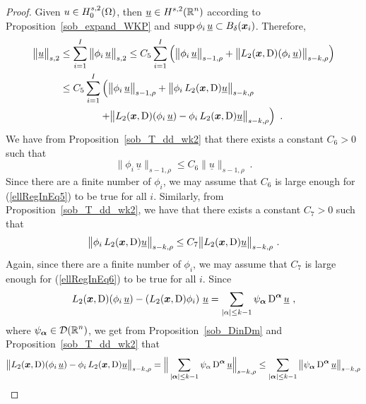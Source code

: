 \begin{proof}
Given $\displaystyle u \in H^{s,2}_0(\Omega)$, then
$\displaystyle \underline{u} \in H^{s,2}(\mathbb{R}^n)$ according to
Proposition~\ref{sob_expand_WKP}
and $\operatorname{supp} \phi_i\,\underline{u} \subset B_\delta({\bm{x}}_i)$.  Therefore,
\begin{align}
\big\|\underline{u}\big\|_{s,2}
& \leq \sum_{i=1}^I \big\|\phi_i\,\underline{u}\big\|_{s,2}
\leq C_5 \sum_{i=1}^I \left( \big\|\phi_i\,\underline{u}\big\|_{s-1,\rho} +
\big\|L_2({\bm{x}},\operatorname{D})(\phi_i\,\underline{u})\big\|_{s-k,\rho} \right)
\nonumber \\
&\leq C_5 \sum_{i=1}^I \left( \big\|\phi_i\,\underline{u}\big\|_{s-1,\rho}
+ \big\|\phi_i \, L_2({\bm{x}},\operatorname{D})\underline{u} \big\|_{s-k,\rho}
\right. \nonumber \\
&\qquad \qquad \left. + \big\|L_2({\bm{x}},\operatorname{D})(\phi_i\,\underline{u})
- \phi_i\, L_2({\bm{x}},\operatorname{D})\underline{u} \big\|_{s-k,\rho} \right) \ .
\label{ellRegInEq4}
\end{align}
We have from Proposition~\ref{sob_T_dd_wk2} that there exists
a constant $C_6>0$ such that
\begin{equation} \label{ellRegInEq5}
\big\|\phi_i\,\underline{u}\big\|_{s-1,\rho}
\leq C_6 \big\|\underline{u}\big\|_{s-1,\rho} \ .
\end{equation}
Since there are a finite number of $\phi_i$, we may assume that $C_6$
is large enough for (\ref{ellRegInEq5}) to be true for all $i$.
Similarly, from Proposition~\ref{sob_T_dd_wk2}, we have that there exists
a constant $C_7>0$ such that
\begin{equation} \label{ellRegInEq6}
\big\|\phi_i\, L_2(\VEC{x},\diff)\underline{u}\big\|_{s-k,\rho}
\leq C_7 \big\|L_2(\VEC{x},\diff)\underline{u}\big\|_{s-k,\rho} \ .
\end{equation}
Again, since there are a finite number of $\phi_i$, we may assume that $C_7$
is large enough for (\ref{ellRegInEq6}) to be true for all $i$.
Since
\[
L_2({\bm{x}},\operatorname{D})(\phi_i\,\underline{u})
- \left(L_2({\bm{x}},\operatorname{D})\phi_i\right) \,\underline{u}
= \sum_{|\alpha|\leq k-1} \psi_{{\bm{\alpha}}} \operatorname{D}^{{\bm{\alpha}}} \underline{u} \ ,
\]
where $\displaystyle \psi_{{\bm{\alpha}}} \in \mathcal{D}(\mathbb{R}^n)$, we get from
Proposition~\ref{sob_DinDm} and Proposition~\ref{sob_T_dd_wk2} that
\begin{align}
&\big\|L_2(\VEC{x},\diff)(\phi_i\,\underline{u})
- \phi_i\, L_2(\VEC{x},\diff)\underline{u} \big\|_{s-k,\rho}
= \Big\| \sum_{|\VEC{\alpha}|\leq k-1} \psi_{\alpha}
\diff^{\VEC{\alpha}} \underline{u} \Big\|_{s-k,\rho}
\leq \sum_{|\VEC{\alpha}|\leq k-1} \big\| \psi_{\VEC{\alpha}}
\diff^{\VEC{\alpha}} \underline{u} \big\|_{s-k,\rho} \nonumber \\

\end{align}
\end{proof}

